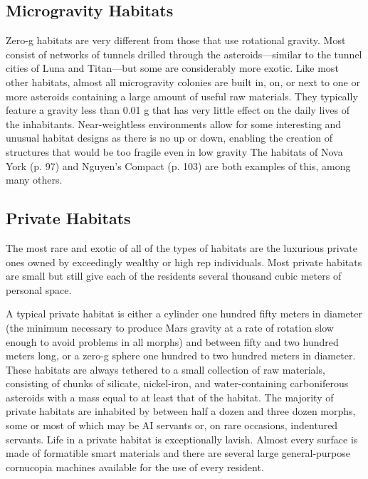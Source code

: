 \subsection{Microgravity Habitats}

Zero-g habitats are very different from those that 
use rotational gravity. Most consist of networks of 
tunnels drilled through the asteroids—similar to the 
tunnel cities of Luna and Titan—but some are considerably
more exotic. Like most other habitats, almost
all microgravity colonies are built in, on, or next to 
one or more asteroids containing a large amount of 
useful raw materials. They typically feature a gravity 
less than 0.01 g that has very little effect on the daily 
lives of the inhabitants. Near-weightless environments 
allow for some interesting and unusual habitat designs 
as there is no up or down, enabling the creation of 
structures that would be too fragile even in low gravity
The habitats of Nova York (p. 97) and Nguyen's
Compact (p. 103) are both examples of this, among 
many others.

\subsection{Private Habitats}

The most rare and exotic of all of the types of habitats 
are the luxurious private ones owned by exceedingly 
wealthy or high rep individuals. Most private habitats 
are small but still give each of the residents several 
thousand cubic meters of personal space.

A typical private habitat is either a cylinder one 
hundred fifty meters in diameter (the minimum necessary
to produce Mars gravity at a rate of rotation
slow enough to avoid problems in all morphs) and 
between fifty and two hundred meters long, or a 
zero-g sphere one hundred to two hundred meters 
in diameter. These habitats are always tethered to 
a small collection of raw materials, consisting of 
chunks of silicate, nickel-iron, and water-containing 
carboniferous asteroids with a mass equal to at 
least that of the habitat. The majority of private 
habitats are inhabited by between half a dozen and 
three dozen morphs, some or most of which may 
be AI servants or, on rare occasions, indentured 
servants. Life in a private habitat is exceptionally 
lavish. Almost every surface is made of formatible 
smart materials and there are several large general-purpose
cornucopia machines available for the use
of every resident.


